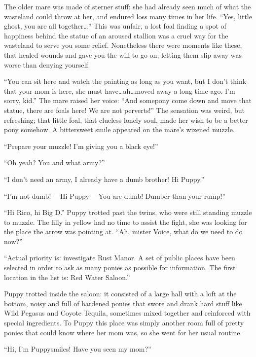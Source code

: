 The older mare was made of sterner stuff: she had already seen much of what the wasteland could throw at her, and endured loss many times in her life. ``Yes, little ghost, you are all together\dots'' This was unfair, a lost foal finding a spot of happiness behind the statue of an aroused stallion was a cruel way for the wasteland to serve you some relief. Nonetheless there were moments like these, that healed wounds and gave you the will to go on; letting them slip away was worse than denying yourself.

``You can sit here and watch the painting as long as you want, but I don't think that your mom is here, she must have\dots ah\dots moved away a long time ago. I'm sorry, kid.'' The mare raised her voice: ``And somepony come down and move that statue, there are foals here! We are not perverts!'' The sensation was weird, but refreshing; that little foal, that clueless lonely soul, made her wish to be a better pony somehow. A bittersweet smile appeared on the mare's wizened muzzle.

\horizonline


``Prepare your muzzle! I'm giving you a black eye!''

``Oh yeah? You and what army?''

``I don't need an army, I already have a dumb brother! Hi Puppy.''

``I'm not dumb! ---Hi Puppy--- You are dumb! Dumber than your rump!''

``Hi Rico, hi Big D.'' Puppy trotted past the twins, who were still standing muzzle to muzzle. The filly in yellow had no time to assist the fight, she was looking for the place the arrow was pointing at. ``Ah, mister Voice, what do we need to do now?''

``Actual priority is: investigate Rust Manor. A set of public places have been selected in order to ask as many ponies as possible for information. The first location in the list is: Red Water Saloon.''

Puppy trotted inside the saloon: it consisted of a large hall with a loft at the bottom, noisy and full of hardened ponies that swore and drank hard stuff like Wild Pegasus and Coyote Tequila, sometimes mixed together and reinforced with special ingredients. To Puppy this place was simply another room full of pretty ponies that could know where her mom was, so she went for her usual routine.

``Hi, I'm Puppysmiles! Have you seen my mom?''

